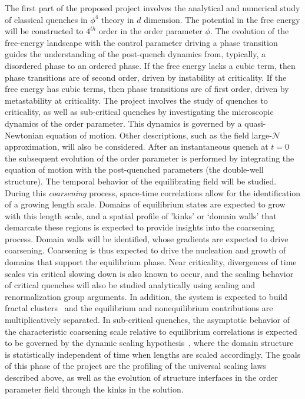 \documentclass[a4paper,9pt]{article}
\begin{document}
The first part of the proposed project involves the analytical and numerical study of classical quenches in $\phi^4$ theory in  {$d$} 
dimension. The potential in the free energy will be constructed to $4^{th}$ order in the order parameter $\phi$. The evolution of the free-energy landscape with the control parameter driving a phase transition guides the understanding of the post-quench dynamics from, typically, a disordered phase to an ordered phase. If the free energy lacks a cubic term, then phase transitions are of second order, driven by instability at criticality. If the free energy has cubic terms, then phase transitions are of first order, driven by metastability at criticality. The project involves the study of quenches to criticality, as well as sub-critical quenches by investigating the microscopic dynamics of the order parameter. This dynamics is governed by a quasi-Newtonian equation of motion. Other descriptions, such as the field 
large-$\mathcal{N}$ approximation, will also be considered. After an instantaneous quench at $t=0$ the subsequent evolution of the order parameter is performed by integrating the equation of motion with the post-quenched parameters  {(the double-well structure)}. The temporal behavior of the equilibrating field will be studied. During this \textit{coarsening} process, space-time correlations allow for the identification of a growing length scale. Domains of equilibrium states are expected to grow with this length scale, and a spatial profile of 'kinks' or  {`domain walls'} that demarcate these regions is expected to provide insights into the coarsening process. Domain walls will be identified, whose gradients are expected to drive coarsening. Coarsening is thus expected to drive the nucleation and growth of domains that support the equilibrium phase. Near criticality, divergences of time scales via critical slowing down is also known to occur, and the scaling behavior of critical quenches will also be studied analytically using scaling and renormalization group arguments. In addition, the system is expected to build fractal clusters~\cite{fractal}
and the equilibrium and nonequilibrium contributions are multiplicatively separated. In sub-critical quenches, the asymptotic behavior of the characteristic coarsening scale relative to equilibrium correlations is expected to be governed by the dynamic scaling hypothesis~\cite{dynscal}, where the domain structure is statistically independent of time when lengths are scaled accordingly. The goals of this phase of the project are the profiling of the universal scaling laws described above, as well as the evolution of structure interfaces in the order parameter field through the kinks in the solution.
\end{document}
